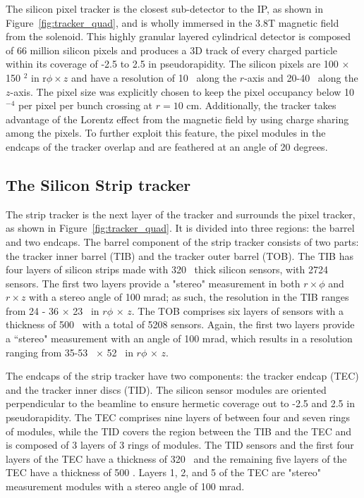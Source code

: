 The silicon pixel tracker is the closest sub-detector to the IP, as shown in Figure~\ref{fig:tracker_quad}, and is wholly immersed in the 3.8T magnetic field from the solenoid. This highly granular layered cylindrical detector is composed of 66 million silicon pixels and produces a 3D track of every charged particle within its coverage of -2.5 to 2.5
in pseudorapidity. The silicon pixels are 100 $\times$ 150 \MM$^{2}$ in r$\phi \times z$ and have a
resolution of 10 \MM \ along the $r$-axis and 20-40 \MM \ along the $z$-axis. The pixel size was explicitly chosen to keep the pixel occupancy below 10$^{-4}$ per pixel per bunch crossing at $r = 10$ cm. Additionally, the tracker takes advantage of the Lorentz effect from the magnetic field by using charge sharing among the pixels. To further exploit this feature, the pixel modules in the endcaps of the tracker overlap and are feathered at an angle of 20 degrees.

\subsection{The Silicon Strip tracker}

The strip tracker is the next layer of the tracker and surrounds the pixel tracker, as shown in Figure~\ref{fig:tracker_quad}. It is divided into three regions: the barrel and two endcaps. The barrel component of the strip tracker consists of two parts: the tracker inner barrel (TIB) and the tracker outer barrel (TOB). The TIB has four layers of silicon strips made with 320 \MM \ thick silicon sensors, with 2724 sensors. The first two layers provide a "stereo" measurement in both $r\times\phi$ and $r\times z$ with a stereo angle of 100 mrad; as such, the resolution in the TIB ranges from 24 - 36 $\times$ 23 \MM \ in $r\phi$ $\times$ $z$. The TOB comprises six layers of sensors with a thickness of 500 \MM \ with a 
total of 5208 sensors. Again, the first two layers provide a ``stereo" measurement with an angle of 100 mrad, which results in a 
resolution ranging from 35-53 \MM \ $\times$ 52 \MM \ in $r\phi$ $\times$ $z$. 

The endcaps of the strip tracker have two components: the tracker endcap (TEC) and the tracker inner discs (TID). The silicon sensor modules are oriented perpendicular to the beamline to ensure 
hermetic coverage out to -2.5 and 2.5 in pseudorapidity. The TEC comprises nine layers of between four and seven rings of modules, while the TID covers the region between the TIB and the TEC and is composed of 3 layers of 3 rings of modules. The TID sensors and the first four layers of the TEC have a thickness of 320 \MM \, and the remaining five layers of the TEC have a thickness of 500 \MM. Layers 1, 2, and 5 of the TEC are "stereo" measurement modules with a stereo angle of 100 mrad.

